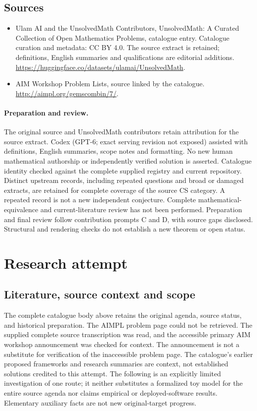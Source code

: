 \documentclass[11pt]{article}
\begin{document}
\subsection{Sources}
\begin{itemize}
\item[S1] Ulam AI and the UnsolvedMath Contributors, UnsolvedMath: A Curated Collection of Open Mathematics Problems, catalogue entry. Catalogue curation and metadata: CC BY 4.0. The source extract is retained; definitions, English summaries and qualifications are editorial additions.
\url{https://huggingface.co/datasets/ulamai/UnsolvedMath}.
\item[S2] AIM Workshop Problem Lists, source linked by the catalogue.
\url{http://aimpl.org/gemscombin/7/}.
\end{itemize}
\paragraph{Preparation and review.}
The original source and UnsolvedMath contributors retain attribution for the source extract. Codex (GPT-6; exact serving revision not exposed) assisted with definitions, English summaries, scope notes and formatting. No new human mathematical authorship or independently verified solution is asserted. Catalogue identity checked against the complete supplied registry and current repository. Distinct upstream records, including repeated questions and broad or damaged extracts, are retained for complete coverage of the source CS category. A repeated record is not a new independent conjecture. Complete mathematical-equivalence and current-literature review has not been performed. Preparation and final review follow contribution prompts C and D, with source gaps disclosed. Structural and rendering checks do not establish a new theorem or open status.
\label{end:statement}

\section{Research attempt}
\subsection{Literature, source context and scope}
The complete catalogue body above retains the original agenda, source status, and historical preparation. The AIMPL problem page could not be retrieved. The supplied complete source transcription was read, and the accessible primary AIM workshop announcement was checked for context. The announcement is not a substitute for verification of the inaccessible problem page. The catalogue's earlier proposed frameworks and research summaries are context, not established solutions credited to this attempt. The following is an explicitly limited investigation of one route; it neither substitutes a formalized toy model for the entire source agenda nor claims empirical or deployed-software results. Elementary auxiliary facts are not new original-target progress.
\end{document}
